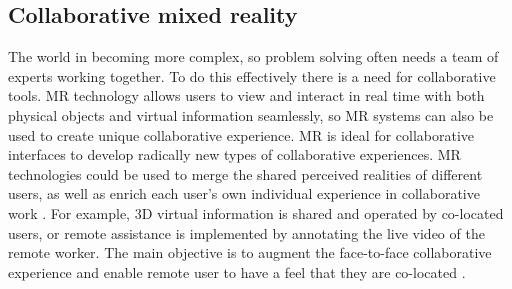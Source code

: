 \subsection{Collaborative mixed reality}
The world in becoming more complex, so problem solving often needs a team of experts working together. To do this effectively there is a need for collaborative tools.
MR technology allows users to view and interact in real time with both physical objects and virtual information seamlessly, so MR systems can also be used to create unique collaborative experience. 
MR is ideal for collaborative interfaces to develop radically new types of collaborative experiences. MR technologies could be used to merge the shared perceived realities of different users, as well as enrich each user's own individual experience in collaborative work \cite{Lukosch2015a}. 
For example, 3D virtual information is shared and operated by co-located users, or remote assistance is implemented by annotating the live video of the remote worker. The main objective is to augment the face-to-face collaborative experience and enable remote user to have a feel that they are co-located \cite{Lukosch2015}. 

